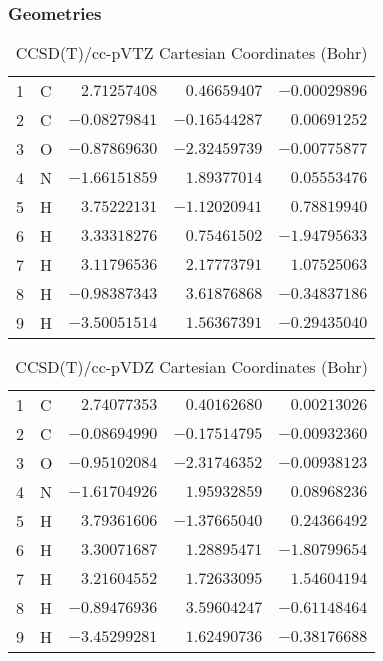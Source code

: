 \documentclass[10pt,oneside]{article}
\begin{document}
\clearpage

\subsection{\ \ \ }

\subsubsection*{Geometries}
\begin{table}[h!]
\centering
\caption{CCSD(T)/cc-pVTZ Cartesian Coordinates (Bohr)}
\begin{tabular}{llrrr}
1  & C  & $ 2.71257408$ & $ 0.46659407$ & $-0.00029896$ \\
2  & C  & $-0.08279841$ & $-0.16544287$ & $ 0.00691252$ \\
3  & O  & $-0.87869630$ & $-2.32459739$ & $-0.00775877$ \\
4  & N  & $-1.66151859$ & $ 1.89377014$ & $ 0.05553476$ \\
5  & H  & $ 3.75222131$ & $-1.12020941$ & $ 0.78819940$ \\
6  & H  & $ 3.33318276$ & $ 0.75461502$ & $-1.94795633$ \\
7  & H  & $ 3.11796536$ & $ 2.17773791$ & $ 1.07525063$ \\
8  & H  & $-0.98387343$ & $ 3.61876868$ & $-0.34837186$ \\
9  & H  & $-3.50051514$ & $ 1.56367391$ & $-0.29435040$ \\
\end{tabular}
\end{table}

\begin{table}[h!]
\centering
\caption{CCSD(T)/cc-pVDZ Cartesian Coordinates (Bohr)}
\begin{tabular}{llrrr}
1  & C  & $ 2.74077353$ & $ 0.40162680$ & $ 0.00213026$ \\
2  & C  & $-0.08694990$ & $-0.17514795$ & $-0.00932360$ \\
3  & O  & $-0.95102084$ & $-2.31746352$ & $-0.00938123$ \\
4  & N  & $-1.61704926$ & $ 1.95932859$ & $ 0.08968236$ \\
5  & H  & $ 3.79361606$ & $-1.37665040$ & $ 0.24366492$ \\
6  & H  & $ 3.30071687$ & $ 1.28895471$ & $-1.80799654$ \\
7  & H  & $ 3.21604552$ & $ 1.72633095$ & $ 1.54604194$ \\
8  & H  & $-0.89476936$ & $ 3.59604247$ & $-0.61148464$ \\
9  & H  & $-3.45299281$ & $ 1.62490736$ & $-0.38176688$ \\
\end{tabular}
\end{table}
\end{document}
